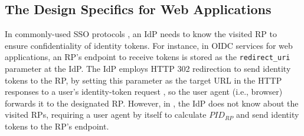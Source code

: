 


\subsection{The Design Specifics for Web Applications}
\label{sec:web-design}


In commonly-used SSO protocols \cite{OpenIDConnect,rfc6749, SAML, SAMLIdentifier},
an IdP needs to know the visited RP to ensure confidentiality of identity tokens. For instance, in OIDC services for web applications, an RP's endpoint to receive tokens is stored as the \verb+redirect_uri+ parameter at the IdP.
The IdP employs HTTP 302 redirection to send identity tokens to the RP, by setting this parameter as the target URL in the HTTP responses to a user's identity-token request \cite{OpenIDConnect}, so the user agent (i.e., browser) forwards it to the designated RP.
However, in \usso, the IdP does not know about the visited RPs, requiring a user agent by itself to calculate $PID_{RP}$ and send identity tokens to the RP's endpoint.

